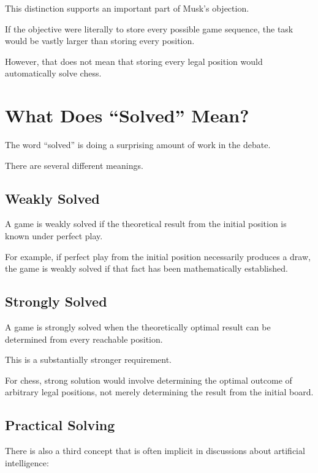 \documentclass[12pt,a4paper]{article}
\begin{document}
This distinction supports an important part of Musk's objection.

If the objective were literally to store every possible game sequence,
the task would be vastly larger than storing every position.

However, that does not mean that storing every legal position would
automatically solve chess.


\section{What Does ``Solved'' Mean?}

The word ``solved'' is doing a surprising amount of work in the debate.

There are several different meanings.

\subsection{Weakly Solved}

A game is weakly solved if the theoretical result from the initial
position is known under perfect play.

For example, if perfect play from the initial position necessarily
produces a draw, the game is weakly solved if that fact has been
mathematically established.

\subsection{Strongly Solved}

A game is strongly solved when the theoretically optimal result can
be determined from every reachable position.

This is a substantially stronger requirement.

For chess, strong solution would involve determining the optimal
outcome of arbitrary legal positions, not merely determining the
result from the initial board.

\subsection{Practical Solving}

There is also a third concept that is often implicit in discussions
about artificial intelligence:
\end{document}
